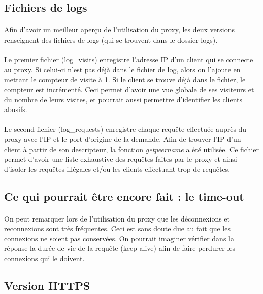 \subsection{Fichiers de logs}
\paragraph{}
Afin d'avoir un meilleur aperçu de l'utilisation du proxy, les deux versions renseignent des fichiers de logs (qui se trouvent dans le dossier logs). 
\paragraph{}
Le premier fichier (log\_visits) enregistre l'adresse IP d'un client qui se connecte au proxy. Si celui-ci n'est pas déjà dans le fichier de log, alors on l'ajoute en mettant le compteur de visite à 1. Si le client se trouve déjà dans le fichier, le compteur est incrémenté. Ceci permet d'avoir une vue globale de ses visiteurs et du nombre de leurs visites, et pourrait aussi permettre d'identifier les clients abusifs. 
\paragraph{}
Le second fichier (log\_requests) enregistre chaque requête effectuée auprès du proxy avec l'IP et le port d'origine de la demande. Afin de trouver l'IP d'un client à partir de son descripteur, la fonction \textit{getpeername} a été utilisée. Ce fichier permet d'avoir une liste exhaustive des requêtes faites par le proxy et ainsi d'isoler les requêtes illégales et/ou les clients effectuant trop de requêtes.

\subsection{Ce qui pourrait être encore fait : le time-out}
\paragraph{}
On peut remarquer lors de l'utilisation du proxy que les déconnexions et reconnexions sont très fréquentes. Ceci est sans doute due au fait que les connexions ne soient pas conservées. On pourrait imaginer vérifier dans la réponse la durée de vie de la requête (keep-alive) afin de faire perdurer les connexions qui le doivent. 

\subsection{Version HTTPS}
